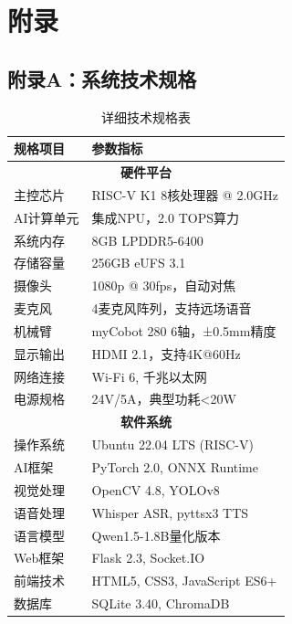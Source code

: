 \documentclass[12pt,a4paper]{article}
\begin{document}
\newpage

\section*{附录}

\subsection*{附录A：系统技术规格}

\begin{table}[H]
    \centering
    \caption{详细技术规格表}
    \begin{tabular}{|l|l|}
        \hline
        \textbf{规格项目} & \textbf{参数指标} \\
        \hline
        \multicolumn{2}{|c|}{\textbf{硬件平台}} \\
        \hline
        主控芯片 & RISC-V K1 8核处理器 @ 2.0GHz \\
        \hline
        AI计算单元 & 集成NPU，2.0 TOPS算力 \\
        \hline
        系统内存 & 8GB LPDDR5-6400 \\
        \hline
        存储容量 & 256GB eUFS 3.1 \\
        \hline
        摄像头 & 1080p @ 30fps，自动对焦 \\
        \hline
        麦克风 & 4麦克风阵列，支持远场语音 \\
        \hline
        机械臂 & myCobot 280 6轴，±0.5mm精度 \\
        \hline
        显示输出 & HDMI 2.1，支持4K@60Hz \\
        \hline
        网络连接 & Wi-Fi 6, 千兆以太网 \\
        \hline
        电源规格 & 24V/5A，典型功耗<20W \\
        \hline
        \multicolumn{2}{|c|}{\textbf{软件系统}} \\
        \hline
        操作系统 & Ubuntu 22.04 LTS (RISC-V) \\
        \hline
        AI框架 & PyTorch 2.0, ONNX Runtime \\
        \hline
        视觉处理 & OpenCV 4.8, YOLOv8 \\
        \hline
        语音处理 & Whisper ASR, pyttsx3 TTS \\
        \hline
        语言模型 & Qwen1.5-1.8B量化版本 \\
        \hline
        Web框架 & Flask 2.3, Socket.IO \\
        \hline
        前端技术 & HTML5, CSS3, JavaScript ES6+ \\
        \hline
        数据库 & SQLite 3.40, ChromaDB \\
        \hline
    \end{tabular}
    \label{tab:tech_specs}
\end{table}
\end{document}
